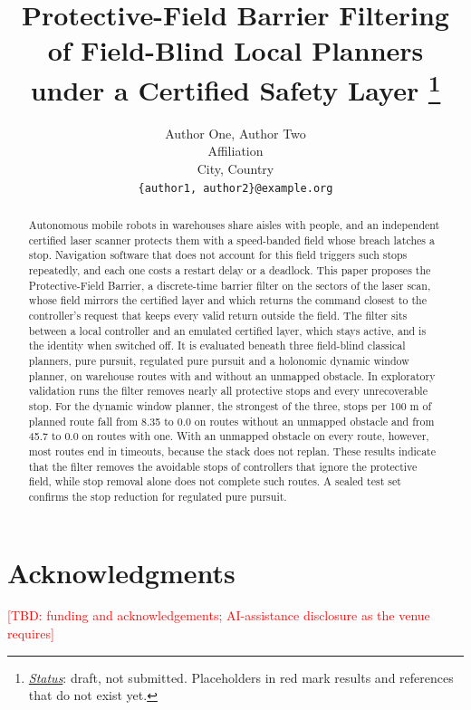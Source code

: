 \documentclass{article}
\title{Protective-Field Barrier Filtering of Field-Blind Local Planners under a Certified Safety Layer
\thanks{\textit{\underline{Status}}: draft, not submitted. Placeholders in red mark results and references that do not exist yet.}
}
\author{
  Author One, Author Two \\
  Affiliation \\
  City, Country \\
  \texttt{\{author1, author2\}@example.org} \\
}
\newcommand{\tbd}[1]{\textcolor{red}{[TBD: #1]}}
\begin{document}
\maketitle

\begin{abstract}
Autonomous mobile robots in warehouses share aisles with people, and an independent certified laser scanner protects them with a speed-banded field whose breach latches a stop. Navigation software that does not account for this field triggers such stops repeatedly, and each one costs a restart delay or a deadlock. This paper proposes the Protective-Field Barrier, a discrete-time barrier filter on the sectors of the laser scan, whose field mirrors the certified layer and which returns the command closest to the controller's request that keeps every valid return outside the field. The filter sits between a local controller and an emulated certified layer, which stays active, and is the identity when switched off. It is evaluated beneath three field-blind classical planners, pure pursuit, regulated pure pursuit and a holonomic dynamic window planner, on warehouse routes with and without an unmapped obstacle. In exploratory validation runs the filter removes nearly all protective stops and every unrecoverable stop. For the dynamic window planner, the strongest of the three, stops per 100 m of planned route fall from 8.35 to 0.0 on routes without an unmapped obstacle and from 45.7 to 0.0 on routes with one. With an unmapped obstacle on every route, however, most routes end in timeouts, because the stack does not replan. These results indicate that the filter removes the avoidable stops of controllers that ignore the protective field, while stop removal alone does not complete such routes. A sealed test set confirms the stop reduction for regulated pure pursuit.
\end{abstract}












\section*{Acknowledgments}
\tbd{funding and acknowledgements; AI-assistance disclosure as the venue requires}



\end{document}

